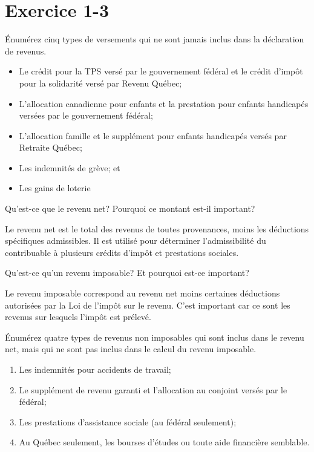 \section{Exercice 1-3}
\setcounter{question}{0}
\begin{question}
	Énumérez cinq types de versements qui ne sont jamais inclus dans la déclaration de revenus.
\end{question}
\begin{itemize}
	\item Le crédit pour la TPS versé par le gouvernement fédéral et le crédit d'impôt pour la solidarité versé par Revenu Québec;
	\item L'allocation canadienne pour enfants et la prestation pour enfants handicapés versées par le gouvernement fédéral;
	\item L'allocation famille et le supplément pour enfants handicapés versés par Retraite Québec;
	\item Les indemnités de grève; et
	\item Les gains de loterie
\end{itemize}

\begin{question}
	Qu'est-ce que le revenu net? Pourquoi ce montant est-il important?
\end{question}
Le \og revenu net\fg{} est le total des revenus de toutes provenances, moins les déductions spécifiques admissibles. Il est utilisé pour déterminer l'admissibilité du contribuable à plusieurs crédits d'impôt et prestations sociales.

\begin{question}
	Qu'est-ce qu'un \og revenu imposable\fg{}? Et pourquoi est-ce important?
\end{question}
Le revenu imposable correspond au revenu net moins certaines déductions autorisées par la Loi de l'impôt sur le revenu. C'est important car ce sont les revenus sur lesquels l'impôt est prélevé.

\begin{question}
	Énumérez quatre types de revenus non imposables qui sont inclus dans le revenu net, mais qui ne sont pas inclus dans le calcul du revenu imposable.
\end{question}
\begin{enumerate}
	\item Les indemnités pour accidents de travail;
	\item Le supplément de revenu garanti et l'allocation au conjoint versés par le fédéral;
	\item Les prestations d'assistance sociale (au fédéral seulement);
	\item Au Québec seulement, les bourses d'études ou toute aide financière semblable.
\end{enumerate}



